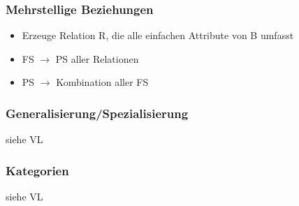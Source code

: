 \subsubsection{Mehrstellige Beziehungen}
\begin{itemize}
	\item Erzeuge Relation R, die alle einfachen Attribute von B umfasst
	\item FS $\to$ PS aller Relationen
	\item PS $\to$ Kombination aller FS
\end{itemize}
\subsubsection{Generalisierung/Spezialisierung}
siehe VL
\subsubsection{Kategorien}
siehe VL
